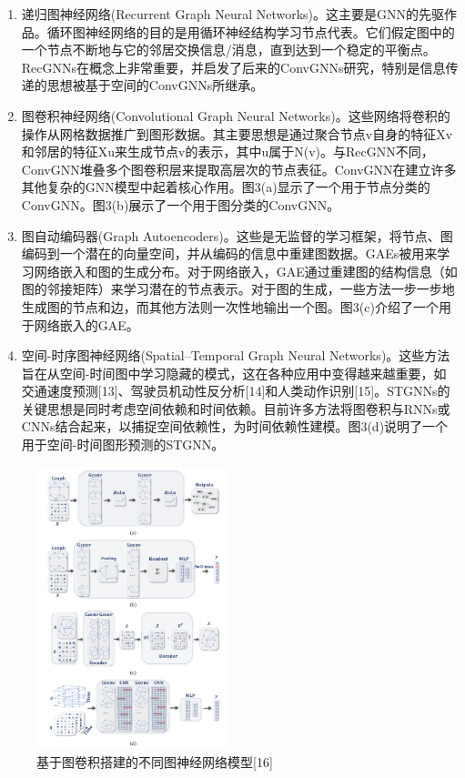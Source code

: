 \documentclass[10pt,journal,compsoc]{IEEEtran}
\begin{document}
\begin{enumerate}
\item 递归图神经网络(Recurrent Graph Neural Networks)。这主要是GNN的先驱作品。循环图神经网络的目的是用循环神经结构学习节点代表。它们假定图中的一个节点不断地与它的邻居交换信息/消息，直到达到一个稳定的平衡点。RecGNNs在概念上非常重要，并启发了后来的ConvGNNs研究，特别是信息传递的思想被基于空间的ConvGNNs所继承。
\item 图卷积神经网络(Convolutional Graph Neural Networks)。这些网络将卷积的操作从网格数据推广到图形数据。其主要思想是通过聚合节点v自身的特征Xv和邻居的特征Xu来生成节点v的表示，其中u属于N(v)。与RecGNN不同，ConvGNN堆叠多个图卷积层来提取高层次的节点表征。ConvGNN在建立许多其他复杂的GNN模型中起着核心作用。图3(a)显示了一个用于节点分类的ConvGNN。图3(b)展示了一个用于图分类的ConvGNN。
\item 图自动编码器(Graph Autoencoders)。这些是无监督的学习框架，将节点、图编码到一个潜在的向量空间，并从编码的信息中重建图数据。GAEs被用来学习网络嵌入和图的生成分布。对于网络嵌入，GAE通过重建图的结构信息（如图的邻接矩阵）来学习潜在的节点表示。对于图的生成，一些方法一步一步地生成图的节点和边，而其他方法则一次性地输出一个图。图3(c)介绍了一个用于网络嵌入的GAE。
\item 空间-时序图神经网络(Spatial–Temporal Graph Neural Networks)。这些方法旨在从空间-时间图中学习隐藏的模式，这在各种应用中变得越来越重要，如交通速度预测[13]、驾驶员机动性反分析[14]和人类动作识别[15]。STGNNs的关键思想是同时考虑空间依赖和时间依赖。目前许多方法将图卷积与RNNs或CNNs结合起来，以捕捉空间依赖性，为时间依赖性建模。图3(d)说明了一个用于空间-时间图形预测的STGNN。
\end{enumerate}
\begin{figure}
	\centering
	\includegraphics[width=0.5\textwidth]{2-1}
	\caption{基于图卷积搭建的不同图神经网络模型[16]}
	\label{fig:基于图卷积搭建的不同图神经网络模型}
\end{figure}
\end{document}
